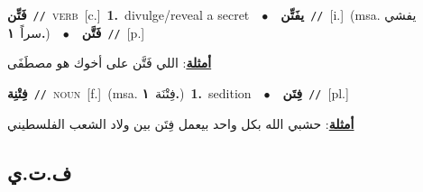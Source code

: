 \documentclass[10pt,a4paper,twoside]{article} %
\begin{document}
\begin{multicols}{2}
{{{{{{{{\setlength\topsep{0pt}\textbf{\foreignlanguage{arabic}{فَتِّن}}\ {\color{gray}\texttt{//}\color{black}}\ \textsc{verb}\ [c.]\ \textbf{1.}~divulge/reveal a secret\ \ $\bullet$\ \ \setlength\topsep{0pt}\textbf{\foreignlanguage{arabic}{يفَتِّن}}\ {\color{gray}\texttt{//}\color{black}}\ [i.]\ \color{gray}(msa. \foreignlanguage{arabic}{يفشي سراً}~\foreignlanguage{arabic}{\textbf{١.}})\color{black}\ \ $\bullet$\ \ \setlength\topsep{0pt}\textbf{\foreignlanguage{arabic}{فَتَّن}}\ {\color{gray}\texttt{//}\color{black}}\ [p.]\  \begin{flushright}\color{gray}\foreignlanguage{arabic}{\textbf{\underline{\foreignlanguage{arabic}{أمثلة}}}: اللي فَتَّن على أخوك هو مصطَفَى}\end{flushright}\color{black}} \vspace{2mm}

{\setlength\topsep{0pt}\textbf{\foreignlanguage{arabic}{فِتْنِة}}\ {\color{gray}\texttt{//}\color{black}}\ \textsc{noun}\ [f.]\ \color{gray}(msa. \foreignlanguage{arabic}{فِتْنَة}~\foreignlanguage{arabic}{\textbf{١.}})\color{black}\ \textbf{1.}~sedition\ \ $\bullet$\ \ \setlength\topsep{0pt}\textbf{\foreignlanguage{arabic}{فِتَن}}\ {\color{gray}\texttt{//}\color{black}}\ [pl.]\  \begin{flushright}\color{gray}\foreignlanguage{arabic}{\textbf{\underline{\foreignlanguage{arabic}{أمثلة}}}: حشبي الله بكل واحد بيعمل فِتَن بين ولاد الشعب الفلسطيني}\end{flushright}\color{black}} \vspace{2mm}

\vspace{-3mm}
\subsection*{\color{blue}\foreignlanguage{arabic}{ف.ت.ي}\color{blue}{}} 

}}}}}}}
\end{multicols}
\end{document}
